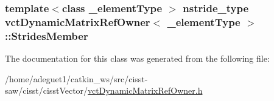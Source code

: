 \hypertarget{classvct_dynamic_matrix_ref_owner_a90a7ffe471468b4df2e172b824e54b18}{
\subsubsection[{Strides\-Member}]{\setlength{\rightskip}{0pt plus 5cm}template$<$class \-\_\-element\-Type $>$ nstride\-\_\-type {\bf vct\-Dynamic\-Matrix\-Ref\-Owner}$<$ \-\_\-element\-Type $>$\-::Strides\-Member\hspace{0.3cm}{\ttfamily [protected]}}}\label{classvct_dynamic_matrix_ref_owner_a90a7ffe471468b4df2e172b824e54b18}


The documentation for this class was generated from the following file\-:\begin{DoxyCompactItemize}
\item 
/home/adeguet1/catkin\-\_\-ws/src/cisst-\/saw/cisst/cisst\-Vector/\hyperlink{vct_dynamic_matrix_ref_owner_8h}{vct\-Dynamic\-Matrix\-Ref\-Owner.\-h}\end{DoxyCompactItemize}
